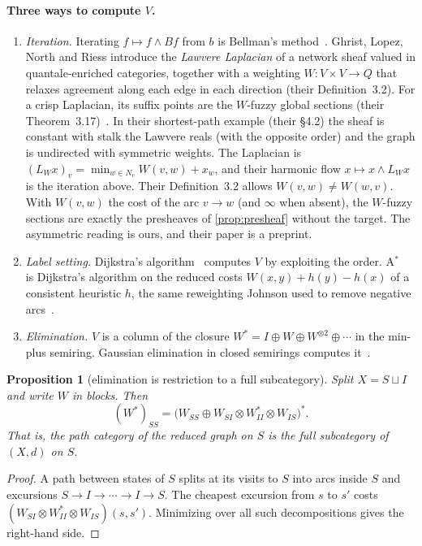 \documentclass[11pt]{article}
\newtheorem{proposition}[theorem]{Proposition}
\theoremstyle{definition}
\theoremstyle{remark}
\newcommand{\dd}{d}
\begin{document}
\paragraph{Three ways to compute $V$.}
\begin{enumerate}[nosep]
\item \emph{Iteration.} Iterating $f \mapsto f \wedge Bf$ from $b$ is Bellman's
  method~\cite{bellman1958}. Ghrist, Lopez, North and Riess introduce the
  \emph{Lawvere Laplacian} of a network sheaf valued in quantale-enriched
  categories, together with a weighting $W : V \times V \to Q$ that relaxes
  agreement along each edge in each direction (their Definition~3.2). For
  a crisp Laplacian, its suffix points are the $W$-fuzzy global sections
  (their Theorem~3.17)~\cite{ghrist2025diffusion}. In their shortest-path
  example (their \S4.2) the sheaf is constant with stalk the Lawvere reals (with
  the opposite order) and the graph is undirected with symmetric weights. The
  Laplacian is $(L_W x)_v = \min_{w \in N_v} W(v,w) + x_w$, and their harmonic
  flow $x \mapsto x \wedge L_W x$ is the iteration above. Their Definition~3.2
  allows $W(v,w) \ne W(w,v)$. With $W(v,w)$ the cost of the arc $v \to w$ (and
  $\infty$ when absent), the $W$-fuzzy sections are exactly the presheaves of
  \cref{prop:presheaf} without the target. The asymmetric reading is ours, and
  their paper is a preprint.
\item \emph{Label setting.} Dijkstra's algorithm~\cite{dijkstra1959} computes $V$
  by exploiting the order. A$^*$~\cite{hart1968} is Dijkstra's algorithm on the
  reduced costs $W(x,y) + h(y) - h(x)$ of a consistent heuristic $h$, the same
  reweighting Johnson used to remove negative arcs~\cite{johnson1977}.
\item \emph{Elimination.} $V$ is a column of the closure
  $W^* = I \oplus W \oplus W^{\otimes 2} \oplus \cdots$ in the min-plus semiring.
  Gaussian elimination in closed semirings computes it~\cite{carre1971,lehmann1977}.
\end{enumerate}

\begin{proposition}[elimination is restriction to a full subcategory]\label{prop:schur}
Split $X = S \sqcup I$ and write $W$ in blocks. Then
\[
(W^*)_{SS} = \big(W_{SS} \oplus W_{SI} \otimes W_{II}^* \otimes W_{IS}\big)^* .
\]
That is, the path category of the reduced graph on $S$ is the full subcategory of
$(X,\dd)$ on $S$.
\end{proposition}
\begin{proof}
A path between states of $S$ splits at its visits to $S$ into arcs inside $S$ and
excursions $S \to I \to \cdots \to I \to S$. The cheapest excursion from $s$ to $s'$
costs $(W_{SI} \otimes W_{II}^* \otimes W_{IS})(s,s')$. Minimizing over all such
decompositions gives the right-hand side.
\end{proof}
\end{document}
